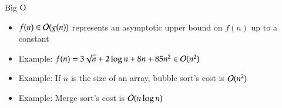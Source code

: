 \documentclass[10pt]{beamer}
\begin{document}


\begin{frame}{Big O}

\begin{itemize}

  \item $f(n)\in{\mathcal{O}}(g(n))$ represents an asymptotic upper bound on $f(n)$ up to a constant
  \bigskip
  \item Example: $f(n) = 3\sqrt{n} + 2\log n + 8 n + 85 n^2 \in {\mathcal{O}}(n^2)$
  \item Example: If $n$ is the size of an array, bubble sort's cost is  ${\mathcal{O}}(n^2)$
  \item Example: Merge sort's cost is  ${\mathcal{O}}(n\log n)$
\end{itemize}
\end{frame}
\end{document}
